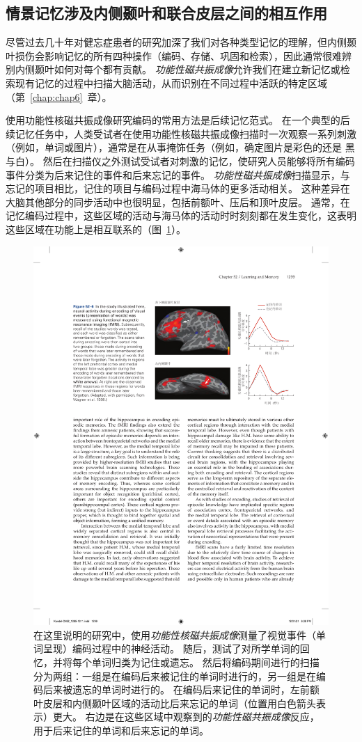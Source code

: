 \subsection{情景记忆涉及内侧颞叶和联合皮层之间的相互作用}

尽管过去几十年对健忘症患者的研究加深了我们对各种类型记忆的理解，但内侧颞叶损伤会影响记忆的所有四种操作（编码、存储、巩固和检索），因此通常很难辨别内侧颞叶如何对每个都有贡献。
\textit{功能性磁共振成像}允许我们在建立新记忆或检索现有记忆的过程中扫描大脑活动，从而识别在不同过程中活跃的特定区域（第~\ref{chap:chap6}~章）。


使用功能性核磁共振成像研究编码的常用方法是后续记忆范式。
在一个典型的后续记忆任务中，人类受试者在使用功能性核磁共振成像扫描时一次观察一系列刺激（例如，单词或图片），通常是在从事掩饰任务（例如，确定图片是彩色的还是 黑与白）。
然后在扫描仪之外测试受试者对刺激的记忆，使研究人员能够将所有编码事件分类为后来记住的事件和后来忘记的事件。
\textit{功能性磁共振成像}扫描显示，与忘记的项目相比，记住的项目与编码过程中海马体的更多活动相关。
这种差异在大脑其他部分的同步活动中也很明显，包括前额叶、压后和顶叶皮层。
通常，在记忆编码过程中，这些区域的活动与海马体的活动时时刻刻都在发生变化，这表明这些区域在功能上是相互联系的（图~\ref{fig:52_6}）。


\begin{figure}[htbp]
	\centering
	\includegraphics[width=0.8\linewidth]{chap52/fig_52_6}
	\caption{在这里说明的研究中，使用\textit{功能性核磁共振成像}测量了视觉事件（单词呈现）编码过程中的神经活动。
		随后，测试了对所学单词的回忆，并将每个单词归类为记住或遗忘。
		然后将编码期间进行的扫描分为两组：一组是在编码后来被记住的单词时进行的，另一组是在编码后来被遗忘的单词时进行的。
		在编码后来记住的单词时，左前额叶皮层和内侧颞叶区域的活动比后来忘记的单词（位置用白色箭头表示）更大。
		右边是在这些区域中观察到的\textit{功能性磁共振成像}反应，用于后来记住的单词和后来忘记的单词\cite{wagner1998building}。}
	\label{fig:52_6}
\end{figure}


